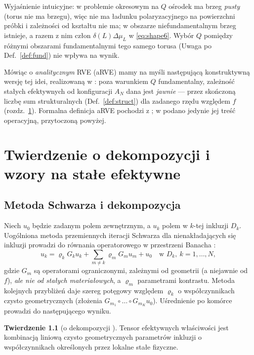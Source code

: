 \documentclass[12pt,a4paper,twoside,openright]{report}
\theoremstyle{definition}
\newtheorem{twierdzenie}[definicja]{Twierdzenie}
\theoremstyle{remark}
\begin{document}
Wyjaśnienie intuicyjne: w problemie okresowym na $Q$ ośrodek ma brzeg \emph{pusty} (torus nie ma brzegu), więc nie ma ładunku polaryzacyjnego na powierzchni próbki i zależności od kształtu nie ma; w obszarze niefundamentalnym brzeg istnieje, a razem z nim człon $\delta(L)\Delta\mu_L$ w \eqref{eq:shape6}. Wybór $Q$ pomiędzy różnymi obszarami fundamentalnymi tego samego torusa (Uwaga po Def.~\ref{def:fund}) nie wpływa na wynik.

Mówiąc o \emph{analitycznym} RVE (aRVE) \cite{mityushev2006representative} mamy na myśli następującą konstruktywną wersję tej idei, realizowaną w \cite{mityushev2025computational,czapla2025computational}: poza warunkiem $Q$ fundamentalny, zależność stałych efektywnych od konfiguracji $A_N$ dana jest \emph{jawnie} --- przez skończoną liczbę sum strukturalnych (Def.~\ref{def:struct}) dla zadanego rzędu względem $f$ (rozdz.~\ref{sec:decomp}). Formalna definicja aRVE pochodzi z \cite{mityushev2006representative}; w \cite{czapla2025computational,mityushev2025computationalpart3} podano jedynie jej treść operacyjną, przytoczoną powyżej.


\chapter{Twierdzenie o dekompozycji i wzory na stałe efektywne}\label{sec:decomp}

\section{Metoda Schwarza i dekompozycja}

Niech $u_0$ będzie zadanym polem zewnętrznym, a $u_k$ polem w $k$-tej inkluzji $D_k$. Uogólniona metoda przemiennych iteracji Schwarza dla nienakładających się inkluzji prowadzi do równania operatorowego w przestrzeni Banacha \cite{mityushev2025computationalpart3}:
\begin{equation}\label{eq:schwarz}
u_k=\varrho_kG_ku_k+\sum_{m\ne k}\varrho_mG_mu_m+u_0\quad\text{w }D_k,\ k=1,\dots,N,
\end{equation}
gdzie $G_m$ są operatorami ograniczonymi, zależnymi od geometrii (a niejawnie od $f$), \emph{ale nie od stałych materiałowych}, a $\varrho_m$ parametrami kontrastu. Metoda kolejnych przybliżeń daje szereg potęgowy względem $\varrho_k$ o współczynnikach czysto geometrycznych (złożenia $G_{m_1}\circ\dots\circ G_{m_K}u_0$). Uśrednienie po komórce prowadzi do następującego wyniku.

\begin{twierdzenie}[o dekompozycji \cite{mityushev2025computationalpart3}]
Tensor efektywnych właściwości jest kombinacją liniową czysto geometrycznych parametrów inkluzji o współczynnikach określonych przez lokalne stałe fizyczne.
\end{twierdzenie}
\end{document}
